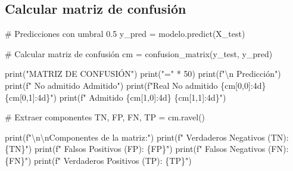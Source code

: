 \documentclass[
  doc,
  floatsintext,
  longtable,
  a4paper,
  nolmodern,
  notxfonts,
  notimes,
  12pt,
  colorlinks=true,linkcolor=blue,citecolor=blue,urlcolor=blue]{apa7}
\newenvironment{Shaded}{\begin{snugshade}}{\end{snugshade}}
\newcommand{\BuiltInTok}[1]{\textcolor[rgb]{0.00,0.23,0.31}{#1}}
\newcommand{\CharTok}[1]{\textcolor[rgb]{0.13,0.47,0.30}{#1}}
\newcommand{\CommentTok}[1]{\textcolor[rgb]{0.37,0.37,0.37}{#1}}
\newcommand{\DecValTok}[1]{\textcolor[rgb]{0.68,0.00,0.00}{#1}}
\newcommand{\NormalTok}[1]{\textcolor[rgb]{0.00,0.23,0.31}{#1}}
\newcommand{\OperatorTok}[1]{\textcolor[rgb]{0.37,0.37,0.37}{#1}}
\newcommand{\SpecialCharTok}[1]{\textcolor[rgb]{0.37,0.37,0.37}{#1}}
\newcommand{\SpecialStringTok}[1]{\textcolor[rgb]{0.13,0.47,0.30}{#1}}
\newcommand{\StringTok}[1]{\textcolor[rgb]{0.13,0.47,0.30}{#1}}
\begin{document}
\subsection{Calcular matriz de
confusión}\label{calcular-matriz-de-confusiuxf3n}

\begin{Shaded}
\begin{Highlighting}[]
\CommentTok{\# Predicciones con umbral 0.5}
\NormalTok{y\_pred }\OperatorTok{=}\NormalTok{ modelo.predict(X\_test)}

\CommentTok{\# Calcular matriz de confusión}
\NormalTok{cm }\OperatorTok{=}\NormalTok{ confusion\_matrix(y\_test, y\_pred)}

\BuiltInTok{print}\NormalTok{(}\StringTok{"MATRIZ DE CONFUSIÓN"}\NormalTok{)}
\BuiltInTok{print}\NormalTok{(}\StringTok{"="} \OperatorTok{*} \DecValTok{50}\NormalTok{)}
\BuiltInTok{print}\NormalTok{(}\SpecialStringTok{f"}\CharTok{\textbackslash{}n}\SpecialStringTok{                 Predicción"}\NormalTok{)}
\BuiltInTok{print}\NormalTok{(}\SpecialStringTok{f"              No admitido  Admitido"}\NormalTok{)}
\BuiltInTok{print}\NormalTok{(}\SpecialStringTok{f"Real No admitido    }\SpecialCharTok{\{}\NormalTok{cm[}\DecValTok{0}\NormalTok{,}\DecValTok{0}\NormalTok{]}\SpecialCharTok{:4d\}}\SpecialStringTok{       }\SpecialCharTok{\{}\NormalTok{cm[}\DecValTok{0}\NormalTok{,}\DecValTok{1}\NormalTok{]}\SpecialCharTok{:4d\}}\SpecialStringTok{"}\NormalTok{)}
\BuiltInTok{print}\NormalTok{(}\SpecialStringTok{f"     Admitido       }\SpecialCharTok{\{}\NormalTok{cm[}\DecValTok{1}\NormalTok{,}\DecValTok{0}\NormalTok{]}\SpecialCharTok{:4d\}}\SpecialStringTok{       }\SpecialCharTok{\{}\NormalTok{cm[}\DecValTok{1}\NormalTok{,}\DecValTok{1}\NormalTok{]}\SpecialCharTok{:4d\}}\SpecialStringTok{"}\NormalTok{)}

\CommentTok{\# Extraer componentes}
\NormalTok{TN, FP, FN, TP }\OperatorTok{=}\NormalTok{ cm.ravel()}

\BuiltInTok{print}\NormalTok{(}\SpecialStringTok{f"}\CharTok{\textbackslash{}n\textbackslash{}n}\SpecialStringTok{Componentes de la matriz:"}\NormalTok{)}
\BuiltInTok{print}\NormalTok{(}\SpecialStringTok{f"  Verdaderos Negativos (TN): }\SpecialCharTok{\{}\NormalTok{TN}\SpecialCharTok{\}}\SpecialStringTok{"}\NormalTok{)}
\BuiltInTok{print}\NormalTok{(}\SpecialStringTok{f"  Falsos Positivos (FP): }\SpecialCharTok{\{}\NormalTok{FP}\SpecialCharTok{\}}\SpecialStringTok{"}\NormalTok{)}
\BuiltInTok{print}\NormalTok{(}\SpecialStringTok{f"  Falsos Negativos (FN): }\SpecialCharTok{\{}\NormalTok{FN}\SpecialCharTok{\}}\SpecialStringTok{"}\NormalTok{)}
\BuiltInTok{print}\NormalTok{(}\SpecialStringTok{f"  Verdaderos Positivos (TP): }\SpecialCharTok{\{}\NormalTok{TP}\SpecialCharTok{\}}\SpecialStringTok{"}\NormalTok{)}
\end{Highlighting}
\end{Shaded}
\end{document}
